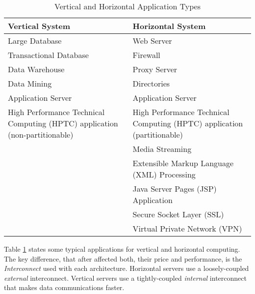 \begin{table}[ht]
    \begin{center}
        \begin{footnotesize}
        \begin{tabular}{| p{50mm} | p{60mm} |}
            \hline
            \textbf{Vertical System} & \textbf{Horizontal System}\\
            \hline
            Large Database & Web Server\\
            \hline
            Transactional Database & Firewall\\
            \hline
            Data Warehouse & Proxy Server\\
            \hline
            Data Mining & Directories\\
            \hline
            Application Server & Application Server\\
            \hline
            High Performance Technical Computing (HPTC) application (non-partitionable) & High Performance Technical Computing (HPTC) application (partitionable)\\
            \hline
            & Media Streaming\\
            \hline
            & Extensible Markup Language (XML) Processing\\
            \hline
            & Java Server Pages (JSP) Application\\
            \hline
            & Secure Socket Layer (SSL)\\
            \hline
            & Virtual Private Network (VPN)\\
            \hline
        \end{tabular}
        \end{footnotesize}
        \caption{Vertical and Horizontal Application Types \cite{atwood}}
        \label{scalability_table}
    \end{center}
\end{table}

Table \ref{scalability_table} states some typical applications for vertical and
horizontal computing. The key difference, that after \cite{atwood} affected
both, their price and performance, is the \emph{Interconnect} used with each
architecture. Horizontal servers use a loosely-coupled \emph{external}
interconnect. Vertical servers use a tightly-coupled \emph{internal}
interconnect that makes data communications faster.
